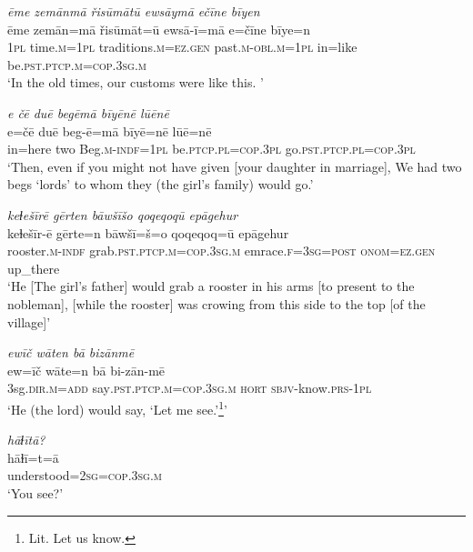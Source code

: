 \ea \label{RE.42}
\textit{ēme zemānmā řisūmātū ewsāymā ečīne bīyen} \\ 
\gll ēme zemān=mā řisūmāt=ū ewsā-ī=mā e=čīne bīye=n \\ 
 \textsc{1pl} time\textsc{.m}\textsc{=\textsc{1pl}} traditions\textsc{.m}\textsc{=ez.gen} past\textsc{.m}\textsc{-obl}\textsc{.m}\textsc{=\textsc{1pl}} in=like be\textsc{.pst}\textsc{.ptcp}\textsc{.m}\textsc{=cop}\textsc{.3sg}\textsc{.m} \\ 
\glt `In the old times, our customs were like this. '
\z 
 
\ea \label{RE.43}
\textit{e čē duē begēmā bīyēnē lūēnē} \\ 
\gll e=čē duē beg-ē=mā bīyē=nē lūē=nē \\ 
 in=here two Beg\textsc{.m}\textsc{-indf}\textsc{=\textsc{1pl}} be\textsc{.ptcp}\textsc{.pl}\textsc{=cop}\textsc{.3pl} go\textsc{.pst}\textsc{.ptcp}\textsc{.pl}\textsc{=cop}\textsc{.3pl} \\ 
\glt `Then, even if you might not have given [your daughter in marriage], We had two begs ‘lords’ to whom they (the girl's family) would go.'
\z 
 
\ea \label{RE.48}
\textit{keɫešīrē gērten bāwšīšo qoqeqoqū epāgehur} \\ 
\gll keɫešīr-ē gērte=n bāwšī=š=o qoqeqoq=ū epāgehur \\ 
 rooster\textsc{.m}\textsc{-indf} grab\textsc{.pst}\textsc{.ptcp}\textsc{.m}\textsc{=cop}\textsc{.3sg}\textsc{.m} emrace\textsc{.f}\textsc{=3sg}\textsc{=\textsc{post}} \textsc{onom}\textsc{=ez.gen} up\_there \\ 
\glt `He [The girl’s father] would grab a rooster in his arms [to present to the nobleman], [while the rooster] was crowing from this side to the top [of the village]'
\z 
 
\ea \label{RE.51}
\textit{ewīč wāten bā bizānmē} \\ 
\gll ew=īč wāte=n bā bi-zān-mē \\ 
 3sg\textsc{.dir}\textsc{.m}\textsc{=add} say\textsc{.pst}\textsc{.ptcp}\textsc{.m}\textsc{=cop}\textsc{.3sg}\textsc{.m} \textsc{hort} \textsc{sbjv-}know\textsc{.prs}\textsc{-\textsc{1pl}} \\ 
\glt `He (the lord) would say, ‘Let me see.’\footnote{Lit. Let us know.}'
\z 
 
\ea \label{RE.53}
\textit{hāɫītā?} \\ 
\gll hāɫī=t=ā \\ 
 understood\textsc{=\textsc{2sg}}\textsc{=cop}\textsc{.3sg}\textsc{.m} \\ 
\glt `You see?'
\z 
 
